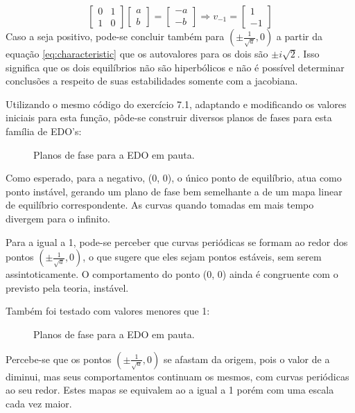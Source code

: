 \documentclass{article}[twocolumn]
\begin{document}
	\begin{equation}
		\left[\begin{array}{cc}
			0 & 1\\
			1 & 0
		\end{array}\right]
		\left[\begin{array}{c}
			a\\
			b
		\end{array}\right] =
		\left[\begin{array}{c}
			-a\\
			-b
		\end{array}\right] \Rightarrow v_{-1} =
		\left[\begin{array}{c}
			1\\
			-1
		\end{array}\right]
		\nonumber
	\end{equation}
	Caso a seja positivo, pode-se concluir tamb\'em para $(\pm\frac{1}{\sqrt{a}}, 0)$ a partir
	da equa\c{c}\~ao \ref{eq:characteristic} que os autovalores para os dois s\~ao
	$\pm i\sqrt{2}$. Isso significa que os dois equil\'ibrios n\~ao s\~ao hiperb\'olicos
	e n\~ao \'e poss\'ivel determinar conclus\~oes a respeito de suas estabilidades somente
	com a jacobiana.

	Utilizando o mesmo c\'odigo do exerc\'icio 7.1, adaptando e modificando os valores iniciais
	para esta fun\c{c}\~ao, p\^ode-se construir diversos planos de fases para esta fam\'ilia
	de EDO's:
	\begin{figure}[H]
		\centering
		\caption{Planos de fase para a EDO em pauta.}
	\end{figure}
	Como esperado, para a negativo, (0, 0), o \'unico ponto de equil\'ibrio, atua como ponto
	inst\'avel, gerando um plano de fase bem semelhante a de um mapa linear de equil\'ibrio
	correspondente. As curvas quando tomadas em mais tempo divergem para o infinito.

	Para a igual a 1, pode-se perceber que curvas peri\'odicas se formam ao redor dos pontos
	$(\pm\frac{1}{\sqrt{a}}, 0)$, o que sugere que eles sejam pontos est\'aveis, sem serem
	assintoticamente. O comportamento do ponto (0, 0) ainda \'e congruente com o previsto
	pela teoria, inst\'avel.
	
	Tamb\'em foi testado com valores menores que 1:
	\begin{figure}[H]
		\centering
		\caption{Planos de fase para a EDO em pauta.}
	\end{figure}
	Percebe-se que os pontos $(\pm\frac{1}{\sqrt{a}}, 0)$ se afastam da origem, pois o valor
	de a diminui, mas seus comportamentos continuam os mesmos, com curvas peri\'odicas
	ao seu redor. Estes mapas se equivalem ao a igual a 1 por\'em com uma escala cada vez
	maior.
\end{document}
